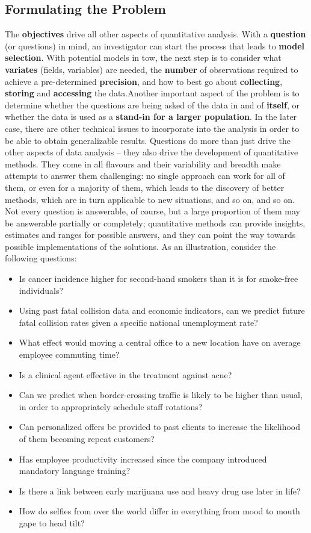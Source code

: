 \subsection{Formulating the Problem} The \textbf{objectives} drive all other aspects of quantitative analysis. With a \textbf{question} (or questions) in mind, an investigator can start the process that leads to \textbf{model selection}. With potential models in tow, the next step is to consider what \textbf{variates} (fields, variables) are needed, the \textbf{number} of observations required to achieve a  pre-determined \textbf{precision}, and how to best go about \textbf{collecting}, \textbf{storing} and \textbf{accessing} the data.\newl Another important aspect of the problem is to determine whether the questions are being asked of the data in and of \textbf{itself}, or whether the data is used as a \textbf{stand-in for a larger population}. In the later case, there are other technical issues to incorporate into the analysis in order to be able to obtain generalizable results.  
\newl Questions do more than just drive the other aspects of data analysis -- they also drive the development of quantitative methods. They come in all flavours and their variability and breadth make attempts to answer them challenging: no single approach can work for all of them, or even for a majority of them, which leads to the discovery of better methods, which are in turn applicable to new situations, and so on, and so on.  
\newl 
Not every question is answerable, of course, but a large proportion of them may be answerable partially or completely; quantitative methods can provide insights, estimates and ranges for possible answers, and they can point the way towards possible implementations of the solutions.
\newl As an illustration, consider the following questions:
\begin{itemize}[noitemsep]
\item Is cancer incidence higher for second-hand smokers than it is for smoke-free individuals? 
\item Using past fatal collision data and economic indicators, can we predict future fatal collision rates given a specific national unemployment rate?   
\item What effect would moving a central office to a new location have on average employee commuting time?  
\item Is a clinical agent effective in the treatment against acne?
\item Can we predict when border-crossing traffic is likely to be higher than usual, in order to appropriately schedule staff rotations? 
\item Can personalized offers be provided to past clients to increase the likelihood of them becoming repeat customers? 
\item Has employee productivity increased since the company introduced mandatory language training?   
\item Is there a link between early marijuana use and heavy drug use later in life? 
\item How do selfies from over the world differ in everything from mood to mouth gape to head tilt?
\end{itemize}

